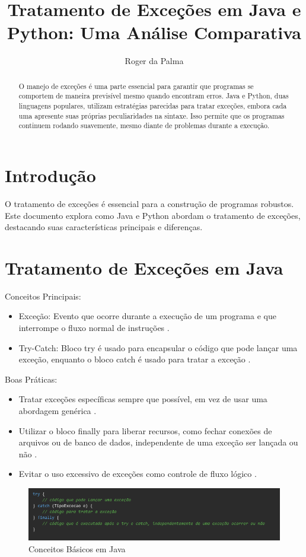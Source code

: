 \documentclass[12pt,a4paper]{article}
\title{Tratamento de Exceções em Java e Python: Uma Análise Comparativa}
\author{Roger da Palma}
\date{}
\begin{document}
\maketitle

\begin{abstract}
O manejo de exceções é uma parte essencial para garantir que programas se comportem de maneira previsível mesmo quando encontram erros. Java e Python, duas linguagens populares, utilizam estratégias parecidas para tratar exceções, embora cada uma apresente suas próprias peculiaridades na sintaxe. Isso permite que os programas continuem rodando suavemente, mesmo diante de problemas durante a execução.
\end{abstract}

\section{Introdução}
O tratamento de exceções é essencial para a construção de programas robustos. Este documento explora como Java e Python abordam o tratamento de exceções, destacando suas características principais e diferenças.

\section{Tratamento de Exceções em Java}
Conceitos Principais:
\begin{itemize}
    \item Exceção: Evento que ocorre durante a execução de um programa e que interrompe o fluxo normal de instruções \cite{java_tut}.
    \item Try-Catch: Bloco try é usado para encapsular o código que pode lançar uma exceção, enquanto o bloco catch é usado para tratar a exceção \cite{java_doc}.
\end{itemize}
Boas Práticas:
\begin{itemize}
    \item Tratar exceções específicas sempre que possível, em vez de usar uma abordagem genérica \cite{java_practices}.
    \item Utilizar o bloco finally para liberar recursos, como fechar conexões de arquivos ou de banco de dados, independente de uma exceção ser lançada ou não \cite{java_doc}.
    \item Evitar o uso excessivo de exceções como controle de fluxo lógico \cite{java_practices}.
\end{itemize}

\begin{figure}[h]
    \centering
    \includegraphics[width=\textwidth]{java.png}
    \caption{Conceitos Básicos em Java}
    \label{fig:imagem1}
\end{figure}
\end{document}
